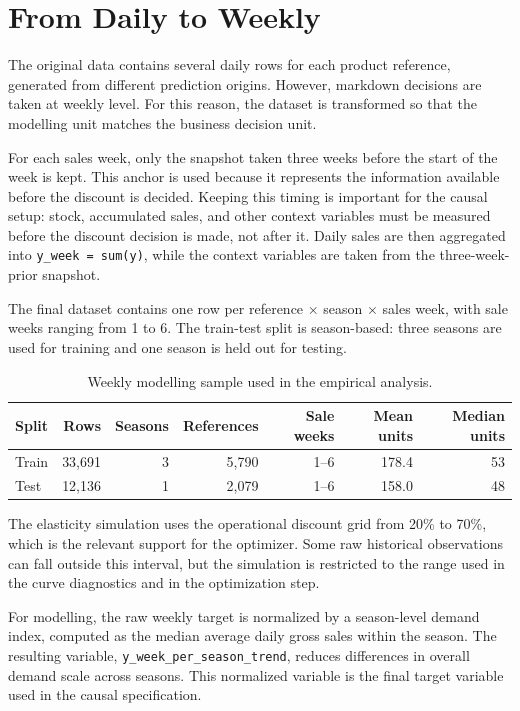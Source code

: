 \section{From Daily to Weekly}

The original data contains several daily rows for each product reference, generated from different prediction origins. However, markdown decisions are taken at weekly level. For this reason, the dataset is transformed so that the modelling unit matches the business decision unit.

For each sales week, only the snapshot taken three weeks before the start of the week is kept. This anchor is used because it represents the information available before the discount is decided. Keeping this timing is important for the causal setup: stock, accumulated sales, and other context variables must be measured before the discount decision is made, not after it. Daily sales are then aggregated into \mbox{\texttt{y\_week = sum(y)}}, while the context variables are taken from the three-week-prior snapshot.

The final dataset contains one row per reference $\times$ season $\times$ sales week, with sale weeks ranging from 1 to 6. The train-test split is season-based: three seasons are used for training and one season is held out for testing.

\begin{table}[h]
\centering
\small
\begin{tabular}{lrrrrrr}
\textbf{Split} & \textbf{Rows} & \textbf{Seasons} & \textbf{References} & \textbf{Sale weeks} & \textbf{Mean units} & \textbf{Median units} \\
\hline
Train & 33,691 & 3 & 5,790 & 1--6 & 178.4 & 53 \\
Test & 12,136 & 1 & 2,079 & 1--6 & 158.0 & 48 \\
\end{tabular}
\caption{Weekly modelling sample used in the empirical analysis.}
\label{tab:weekly-sample-summary}
\end{table}

The elasticity simulation uses the operational discount grid from 20\% to 70\%, which is the relevant support for the optimizer. Some raw historical observations can fall outside this interval, but the simulation is restricted to the range used in the curve diagnostics and in the optimization step.

For modelling, the raw weekly target is normalized by a season-level demand index, computed as the median average daily gross sales within the season. The resulting variable, \mbox{\texttt{y\_week\_per\_season\_trend}}, reduces differences in overall demand scale across seasons. This normalized variable is the final target variable used in the causal specification.

